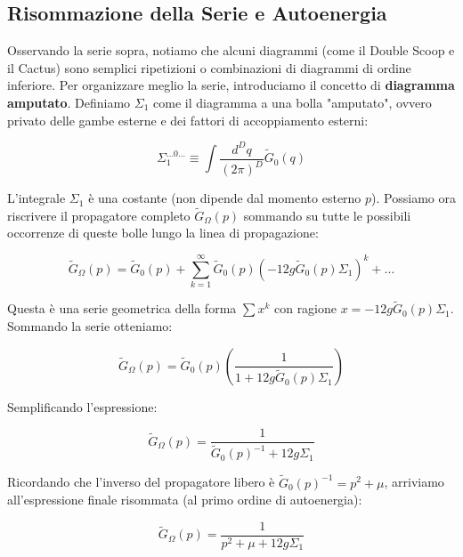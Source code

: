 \subsection{Risommazione della Serie e Autoenergia}

Osservando la serie sopra, notiamo che alcuni diagrammi (come il Double Scoop e il Cactus) sono semplici ripetizioni o combinazioni di diagrammi di ordine inferiore.
Per organizzare meglio la serie, introduciamo il concetto di \textbf{diagramma amputato}.
Definiamo $\Sigma_1$ come il diagramma a una bolla "amputato", ovvero privato delle gambe esterne e dei fattori di accoppiamento esterni:

\begin{equation}
\Sigma_1^{\dots 0 \dots } \equiv \int \frac{d^D q}{(2\pi)^D} \tilde{G}_0(q)
\end{equation}


\noindent L'integrale $\Sigma_1$ è una costante (non dipende dal momento esterno $p$).
Possiamo ora riscrivere il propagatore completo $\tilde{G}_{\Omega}(p)$ sommando su tutte le possibili occorrenze di queste bolle lungo la linea di propagazione:

\begin{equation}
\tilde{G}_{\Omega}(p) = \tilde{G}_0(p) + \sum_{k=1}^{\infty} \tilde{G}_0(p) \left( -12g \tilde{G}_0(p) \Sigma_1 \right)^k + \dots
\end{equation}

\noindent Questa è una serie geometrica della forma $\sum x^k$ con ragione $x = -12g \tilde{G}_0(p) \Sigma_1$.
Sommando la serie otteniamo:

\begin{equation}
\tilde{G}_{\Omega}(p) = \tilde{G}_0(p) \left( \frac{1}{1 + 12g \tilde{G}_0(p) \Sigma_1} \right)
\end{equation}

\noindent Semplificando l'espressione:

\begin{equation}
\tilde{G}_{\Omega}(p) = \frac{1}{\tilde{G}_0(p)^{-1} + 12g \Sigma_1}
\end{equation}

\noindent Ricordando che l'inverso del propagatore libero è $\tilde{G}_0(p)^{-1} = p^2 + \mu$, arriviamo all'espressione finale risommata (al primo ordine di autoenergia):

\begin{tcolorbox}[colback=colorA!10, colframe=colorB!60!colorA,  title=\textbf{Propagatore Completo}]
\begin{equation}
\tilde{G}_{\Omega}(p) = \frac{1}{p^2 + \mu + 12g \Sigma_1}
\end{equation}
\end{tcolorbox}

